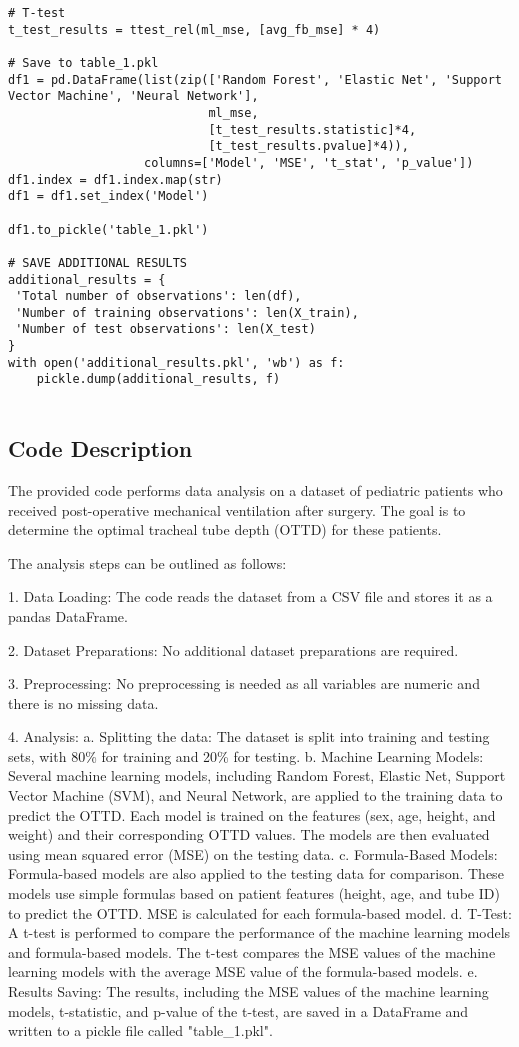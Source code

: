 \documentclass[11pt]{article}
\begin{document}
\begin{verbatim}
# T-test
t_test_results = ttest_rel(ml_mse, [avg_fb_mse] * 4)

# Save to table_1.pkl
df1 = pd.DataFrame(list(zip(['Random Forest', 'Elastic Net', 'Support Vector Machine', 'Neural Network'], 
                            ml_mse, 
                            [t_test_results.statistic]*4, 
                            [t_test_results.pvalue]*4)), 
                   columns=['Model', 'MSE', 't_stat', 'p_value'])
df1.index = df1.index.map(str)
df1 = df1.set_index('Model')

df1.to_pickle('table_1.pkl')

# SAVE ADDITIONAL RESULTS
additional_results = {
 'Total number of observations': len(df), 
 'Number of training observations': len(X_train),
 'Number of test observations': len(X_test)
}
with open('additional_results.pkl', 'wb') as f:
    pickle.dump(additional_results, f)


\end{verbatim}

\subsection{Code Description}

The provided code performs data analysis on a dataset of pediatric patients who received post-operative mechanical ventilation after surgery. The goal is to determine the optimal tracheal tube depth (OTTD) for these patients. 

The analysis steps can be outlined as follows:

1. Data Loading: The code reads the dataset from a CSV file and stores it as a pandas DataFrame.

2. Dataset Preparations: No additional dataset preparations are required.

3. Preprocessing: No preprocessing is needed as all variables are numeric and there is no missing data.

4. Analysis:
   a. Splitting the data: The dataset is split into training and testing sets, with 80\% for training and 20\% for testing.
   b. Machine Learning Models: Several machine learning models, including Random Forest, Elastic Net, Support Vector Machine (SVM), and Neural Network, are applied to the training data to predict the OTTD. Each model is trained on the features (sex, age, height, and weight) and their corresponding OTTD values. The models are then evaluated using mean squared error (MSE) on the testing data.
   c. Formula-Based Models: Formula-based models are also applied to the testing data for comparison. These models use simple formulas based on patient features (height, age, and tube ID) to predict the OTTD. MSE is calculated for each formula-based model.
   d. T-Test: A t-test is performed to compare the performance of the machine learning models and formula-based models. The t-test compares the MSE values of the machine learning models with the average MSE value of the formula-based models.
   e. Results Saving: The results, including the MSE values of the machine learning models, t-statistic, and p-value of the t-test, are saved in a DataFrame and written to a pickle file called "table\_1.pkl".
   
\end{document}
